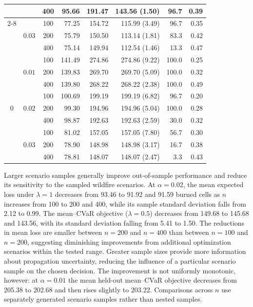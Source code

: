\documentclass[a4paper,fleqn]{cas-sc}
\begin{document}
\begin{table}[!htbp]
\begin{tabular}{@{}ccc r r r r r@{}}
 &  & 400 & 95.66 & 191.47 & 143.56 (1.50) & 96.7 & 0.39 \\
\cmidrule(l){2-8}
 & \multirow{3}{*}{$0.03$} & 100 & 77.25 & 154.72 & 115.99 (3.49) & 96.7 & 0.35 \\
 &  & 200 & 75.79 & 150.50 & 113.14 (1.81) & 83.3 & 0.42 \\
 &  & 400 & 75.14 & 149.94 & 112.54 (1.46) & 13.3 & 0.47 \\
\midrule
\multirow{9}{*}{$0$} & \multirow{3}{*}{$0.01$} & 100 & 141.49 & 274.86 & 274.86 (9.22) & 100.0 & 0.25 \\
 &  & 200 & 139.83 & 269.70 & 269.70 (5.09) & 100.0 & 0.32 \\
 &  & 400 & 139.80 & 268.22 & 268.22 (2.38) & 100.0 & 0.49 \\
\cmidrule(l){2-8}
 & \multirow{3}{*}{$0.02$} & 100 & 100.69 & 199.19 & 199.19 (6.82) & 96.7 & 0.20 \\
 &  & 200 & 99.30 & 194.96 & 194.96 (5.04) & 100.0 & 0.28 \\
 &  & 400 & 98.87 & 192.63 & 192.63 (2.59) & 30.0 & 0.32 \\
\cmidrule(l){2-8}
 & \multirow{3}{*}{$0.03$} & 100 & 81.02 & 157.05 & 157.05 (7.80) & 56.7 & 0.30 \\
 &  & 200 & 78.90 & 148.98 & 148.98 (3.17) & 16.7 & 0.38 \\
 &  & 400 & 78.81 & 148.07 & 148.07 (2.47) & 3.3 & 0.43 \\
\bottomrule
\end{tabular}
\end{table}

Larger scenario samples generally improve out-of-sample performance and
reduce its sensitivity to the sampled wildfire scenarios. At
$\alpha=0.02$, the mean expected loss under $\lambda=1$ decreases from
93.46 to 91.92 and 91.59 burned cells as $n$ increases from 100 to
200 and 400, while its sample standard deviation falls from 2.12 to
0.99. The mean--CVaR objective ($\lambda=0.5$) decreases from 149.68
to 145.68 and 143.56, with its standard deviation falling from 5.41
to 1.50. The reductions in mean loss are smaller between $n=200$ and
$n=400$ than between $n=100$ and $n=200$, suggesting diminishing
improvements from additional optimization scenarios within the tested
range. Greater sample sizes provide more information about propagation
uncertainty, reducing the influence of a particular scenario
sample on the chosen decision. The improvement is not uniformly
monotonic, however: at $\alpha=0.01$ the mean held-out mean--CVaR
objective decreases from 205.38 to 202.68 and then rises slightly
to 203.22. Comparisons across $n$ use separately generated scenario
samples rather than nested samples.
\end{document}
